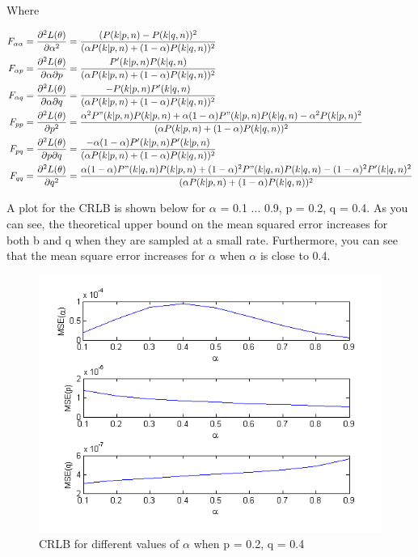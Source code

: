 Where

\begin{align*}
F_{\alpha\alpha} &= \frac{\partial^2L(\mathbb{\theta})}{\partial\alpha^2} = \frac{(P(k | p, n) - P(k | q, n))^2}{(\alpha P(k | p, n) + (1 - \alpha) P(k | q, n))^2} \\
F_{\alpha p} &= \frac{\partial^2L(\mathbb{\theta})}{\partial\alpha\partial p} = \frac{P'(k | p, n)P(k | q, n)}{(\alpha P(k | p, n) + (1 - \alpha) P(k | q, n))^2} \\
F_{\alpha q} &= \frac{\partial^2L(\mathbb{\theta})}{\partial\alpha\partial q} = \frac{-P(k | p, n)P'(k | q, n)}{(\alpha P(k | p, n) + (1 - \alpha) P(k | q, n))^2} \\
F_{pp} &= \frac{\partial^2L(\mathbb{\theta})}{\partial p^2} = \frac{\alpha^2P"(k | p, n)P(k | p, n) + \alpha(1 - \alpha)P"(k | p, n)P(k | q, n) - \alpha^2P(k | p, n)^2}{(\alpha P(k | p, n) + (1 - \alpha) P(k | q, n))^2} \\
F_{pq} &= \frac{\partial^2L(\mathbb{\theta})}{\partial p\partial q} = \frac{-\alpha(1 - \alpha)P'(k | p, n)P'(k | p, n)}{(\alpha P(k | p, n) + (1 - \alpha) P(k | q, n))^2} \\
F_{qq} &= \frac{\partial^2L(\mathbb{\theta})}{\partial q^2} = \frac{\alpha(1 - \alpha)P"(k | q, n)P(k | p, n) + (1 - \alpha)^2P"(k | q, n)P(k | q, n) - (1 - \alpha)^2P'(k | q, n)^2}{(\alpha P(k | p, n) + (1 - \alpha) P(k | q, n))^2}
\end{align*}


A plot for the CRLB is shown below for $\alpha$ = 0.1 ... 0.9, p = 0.2, q = 0.4. As you can see, the theoretical upper bound on the mean squared error increases for both b and q when they are sampled at a small rate. Furthermore, you can see that the mean square error increases for $\alpha$ when $\alpha$ is close to 0.4.

\begin{figure}[!htbp]
	\centering
	\includegraphics[width=\columnwidth]{images/crlb1.png} %
	\vspace{-1pt}
	\caption{CRLB for different values of $\alpha$ when p = 0.2, q = 0.4}
	\vspace{-2pt}
	\label{figure:crlb}
\end{figure}

